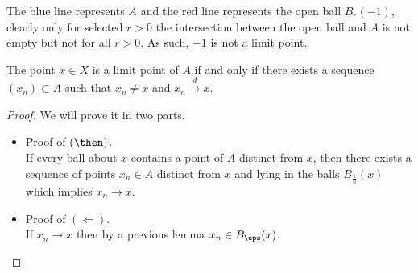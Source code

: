 \documentclass[12pt, a4paper]{article}
\begin{document}
\begin{mdexample}
\begin{enumerate}
\begin{figure}[H]
\begin{center}
{
                }
             \end{center}
        \end{figure}
        The blue line represents \(A\) and the red line represents the open ball \(B_r(-1)\), clearly only for selected \(r>0\) the intersection between the open ball and \(A\) is not empty but not for all \(r>0\). As such, \(-1\) is not a limit point.
    \end{enumerate}
\end{mdexample}

\begin{mdlemma}
    The point \(x \in X\) is a limit point of \(A\) if and only if there exists a sequence \((x_n) \subset A\) such that \(x_n \neq x\) and \(x_n \xrightarrow{d} x\).
\end{mdlemma}

\begin{proof}
    We will prove it in two parts.
    \begin{itemize}
        \item Proof of \((\then)\). \\
        If every ball about \(x\) contains a point of \(A\) distinct from \(x\), then there exists a sequence of points \(x_n \in A\) distinct from \(x\) and lying in the balls \(B_{\frac{1}{n}}(x)\) which implies \(x_n \to x\).
        \item Proof of \((\Leftarrow)\). \\
        If \(x_n \to x\) then by a previous lemma \(x_n \in B_{\eps}(x)\).
    \end{itemize}
\end{proof}
\end{document}
